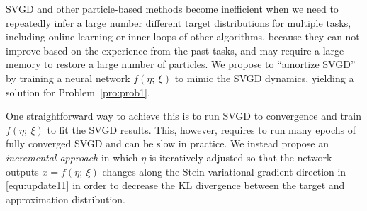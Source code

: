 \documentclass{article} %
\begin{document}
SVGD and other particle-based methods become inefficient when we need to repeatedly infer
a large number different target distributions for multiple tasks, including online learning or inner loops of other algorithms, 
because they can not improve based on the experience from the past tasks, and may require a large memory to restore a large number of particles. 
We propose to ``amortize SVGD'' by training a neural network $f(\eta;~\xi)$ to mimic the SVGD dynamics, yielding a solution for Problem~\ref{pro:prob1}. 

One straightforward way to achieve this is to run SVGD to convergence and 
train $f(\eta;~\xi)$ to fit the SVGD results. 
This, however, requires to run many epochs of fully converged SVGD and can be slow in practice. 
We instead propose an \emph{incremental approach} in which $\eta$ is iteratively adjusted 
so that the network outputs $x = f(\eta;~\xi)$ changes along the Stein variational gradient direction in \eqref{equ:update11} 
in order to decrease the KL divergence between the target and approximation distribution. 
\end{document}
